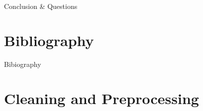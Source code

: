 \documentclass[10pt]{beamer}
\begin{document}

\begin{frame}{Conclusion \& Questions}

\end{frame}

\section{Bibliography}

\begin{frame}[allowframebreaks]{Bibiography}
  \tiny
  {}


\end{frame}

\section{Cleaning and Preprocessing}
\end{document}
